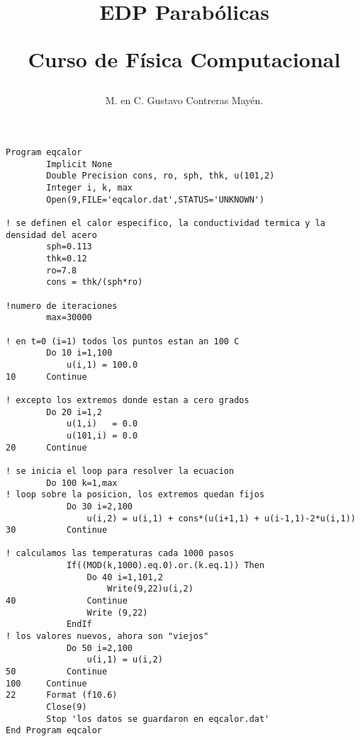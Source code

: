 \documentclass[12pt]{article}
\author{M. en C. Gustavo Contreras Mayén.}
\title{EDP Parab\'{o}licas \\ \begin{Large}Curso de Fí­sica Computacional\end{Large}}
\date{ }
\numberwithin{equation}{section}
\begin{document}
\maketitle
\begin{lstlisting}
Program eqcalor
		Implicit None       
		Double Precision cons, ro, sph, thk, u(101,2)
		Integer i, k, max
		Open(9,FILE='eqcalor.dat',STATUS='UNKNOWN')

! se definen el calor especifico, la conductividad termica y la densidad del acero
		sph=0.113
		thk=0.12
		ro=7.8
		cons = thk/(sph*ro)

!numero de iteraciones
		max=30000

! en t=0 (i=1) todos los puntos estan an 100 C
		Do 10 i=1,100
			u(i,1) = 100.0
10		Continue

! excepto los extremos donde estan a cero grados
		Do 20 i=1,2
			u(1,i)   = 0.0
			u(101,i) = 0.0
20		Continue

! se inicia el loop para resolver la ecuacion
		Do 100 k=1,max
! loop sobre la posicion, los extremos quedan fijos
			Do 30 i=2,100
				u(i,2) = u(i,1) + cons*(u(i+1,1) + u(i-1,1)-2*u(i,1))
30			Continue

! calculamos las temperaturas cada 1000 pasos
			If((MOD(k,1000).eq.0).or.(k.eq.1)) Then
				Do 40 i=1,101,2
					Write(9,22)u(i,2)
40				Continue
				Write (9,22)
			EndIf
! los valores nuevos, ahora son "viejos"
			Do 50 i=2,100
				u(i,1) = u(i,2)
50			Continue
100		Continue
22		Format (f10.6)
		Close(9)
		Stop 'los datos se guardaron en eqcalor.dat'
End Program eqcalor
\end{lstlisting}
\end{document}
